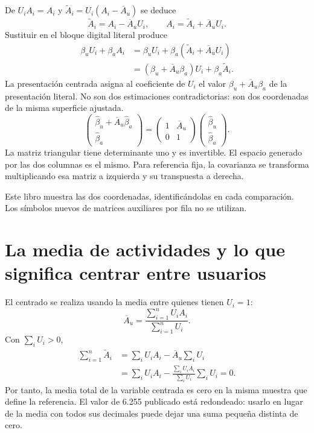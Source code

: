 \documentclass[11pt,a4paper]{article}
\begin{document}
De $U_iA_i=A_i$ y $\widetilde A_i=U_i(A_i-\overline A_u)$ se deduce
\[
\widetilde A_i=A_i-\overline A_uU_i,\qquad
A_i=\widetilde A_i+\overline A_uU_i.
\]
Sustituir en el bloque digital literal produce
\[
\begin{aligned}
\beta_uU_i+\beta_aA_i
&=\beta_uU_i+\beta_a(\widetilde A_i+\overline A_uU_i)\\
&=(\beta_u+\overline A_u\beta_a)U_i+\beta_a\widetilde A_i.
\end{aligned}
\]
La presentación centrada asigna al coeficiente de $U_i$ el valor $\beta_u+\overline A_u\beta_a$ de la presentación literal. No son dos estimaciones contradictorias: son dos coordenadas de la misma superficie ajustada.
\[
\begin{pmatrix}\widehat\beta_u+\overline A_u\widehat\beta_a\\
\widehat\beta_a\end{pmatrix}
=\begin{pmatrix}1&\overline A_u\\0&1\end{pmatrix}
\begin{pmatrix}\widehat\beta_u\\\widehat\beta_a\end{pmatrix}.
\]
La matriz triangular tiene determinante uno y es invertible. El espacio generado por las dos columnas es el mismo. Para referencia fija, la covarianza se transforma multiplicando esa matriz a izquierda y su transpuesta a derecha.

Este libro muestra las dos coordenadas, identificándolas en cada comparación. Los símbolos nuevos de matrices auxiliares por fila no se utilizan.

\clearpage
\section{La media de actividades y lo que significa centrar entre usuarios}

El centrado se realiza usando la media entre quienes tienen $U_i=1$:
\[
\overline A_u=\frac{\sum_{i=1}^{n}U_iA_i}{\sum_{i=1}^{n}U_i}.
\]
Con $\sum_iU_i>0$,
\[
\begin{aligned}
\sum_{i=1}^{n}\widetilde A_i
&=\sum_iU_iA_i-\overline A_u\sum_iU_i\\
&=\sum_iU_iA_i-
\frac{\sum_iU_iA_i}{\sum_iU_i}\sum_iU_i=0.
\end{aligned}
\]
Por tanto, la media total de la variable centrada es cero en la misma muestra que define la referencia. El valor de 6.255 publicado está redondeado: usarlo en lugar de la media con todos sus decimales puede dejar una suma pequeña distinta de cero.
\end{document}
